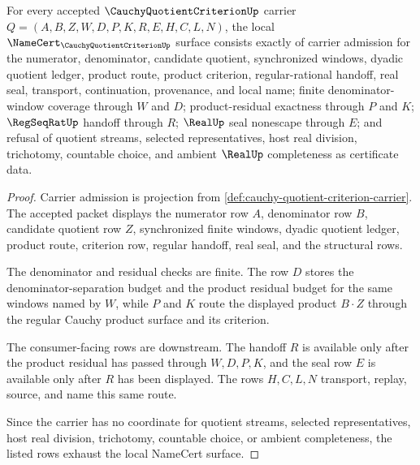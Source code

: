 \begin{theorem}
\label{thm:cauchy-quotient-criterion-namecert-obligations}
For every accepted $\CauchyQuotientCriterionUp$ carrier $Q=(A,B,Z,W,D,P,K,R,E,H,C,L,N)$, the local $\NameCert_{\CauchyQuotientCriterionUp}$ surface consists exactly of carrier admission for the numerator, denominator, candidate quotient, synchronized windows, dyadic quotient ledger, product route, product criterion, regular-rational handoff, real seal, transport, continuation, provenance, and local name; finite denominator-window coverage through $W$ and $D$; product-residual exactness through $P$ and $K$; $\RegSeqRatUp$ handoff through $R$; $\RealUp$ seal nonescape through $E$; and refusal of quotient streams, selected representatives, host real division, trichotomy, countable choice, and ambient $\RealUp$ completeness as certificate data.
\end{theorem}
\begin{proof}
Carrier admission is projection from \autoref{def:cauchy-quotient-criterion-carrier}. The accepted packet displays the numerator row $A$, denominator row $B$, candidate quotient row $Z$, synchronized finite windows, dyadic quotient ledger, product route, criterion row, regular handoff, real seal, and the structural rows.

The denominator and residual checks are finite. The row $D$ stores the denominator-separation budget and the product residual budget for the same windows named by $W$, while $P$ and $K$ route the displayed product $B\cdot Z$ through the regular Cauchy product surface and its criterion.

The consumer-facing rows are downstream. The handoff $R$ is available only after the product residual has passed through $W,D,P,K$, and the seal row $E$ is available only after $R$ has been displayed. The rows $H,C,L,N$ transport, replay, source, and name this same route.

Since the carrier has no coordinate for quotient streams, selected representatives, host real division, trichotomy, countable choice, or ambient completeness, the listed rows exhaust the local NameCert surface.
\end{proof}

